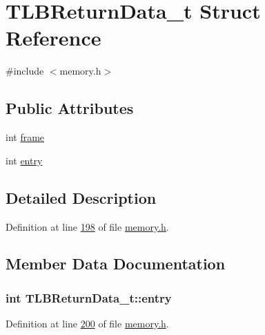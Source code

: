 \hypertarget{structTLBReturnData__t}{}\section{T\+L\+B\+Return\+Data\+\_\+t Struct Reference}
\label{structTLBReturnData__t}


{\ttfamily \#include $<$memory.\+h$>$}

\subsection*{Public Attributes}
\begin{DoxyCompactItemize}
\item 
int \hyperlink{structTLBReturnData__t_ac4bdfa0ee74b50048e94321426877439}{frame}
\item 
int \hyperlink{structTLBReturnData__t_a58914c8a985e6cdb2f48a56ab41a6985}{entry}
\end{DoxyCompactItemize}


\subsection{Detailed Description}


Definition at line \hyperlink{memory_8h_source_l00198}{198} of file \hyperlink{memory_8h_source}{memory.\+h}.



\subsection{Member Data Documentation}
\subsubsection[{\texorpdfstring{entry}{entry}}]{\setlength{\rightskip}{0pt plus 5cm}int T\+L\+B\+Return\+Data\+\_\+t\+::entry}\hypertarget{structTLBReturnData__t_a58914c8a985e6cdb2f48a56ab41a6985}{}\label{structTLBReturnData__t_a58914c8a985e6cdb2f48a56ab41a6985}


Definition at line \hyperlink{memory_8h_source_l00200}{200} of file \hyperlink{memory_8h_source}{memory.\+h}.

